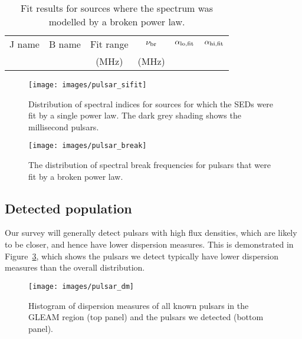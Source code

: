\documentclass{pasa}%
\begin{document}
\begin{table*}
  \centering
  \caption{Fit results for sources where the spectrum was modelled by a broken power law.}
  \label{broken}
  \begin{tabular}{llccrr} %
    \hline
    J name & B name & Fit range & $\nu_{\rm br}$ & $\alpha_{\rm lo, fit}$ & $\alpha_{\rm hi, fit}$ \\
\
           &        & (MHz)       & (MHz) &    &     \\
    \hline

    \hline
  \end{tabular}
\end{table*}

\begin{figure}
\texttt{[image: images/pulsar\_sifit]}
\caption{Distribution of spectral indices for sources for which the SEDs were fit by a single power law. The dark grey shading shows the millisecond pulsars.}
\label{f_sihist}
\end{figure}

\begin{figure}
\texttt{[image: images/pulsar\_break]}
\caption{The distribution of spectral break frequencies for pulsars that were fit by a broken power law.}
\label{f_break}
\end{figure}

\subsection{Detected population}
\label{sec:detected}
Our survey will generally detect pulsars with high flux densities, which are likely to be closer, and hence have lower dispersion measures. This is demonstrated in Figure~\ref{f_dm}, which shows the pulsars we detect
typically have lower dispersion measures than the overall distribution.
\begin{figure}
\texttt{[image: images/pulsar\_dm]}
\caption{Histogram of dispersion measures of all known pulsars in the GLEAM region (top panel) and the pulsars we detected (bottom panel).}\label{f_dm}
\end{figure}
\end{document}
